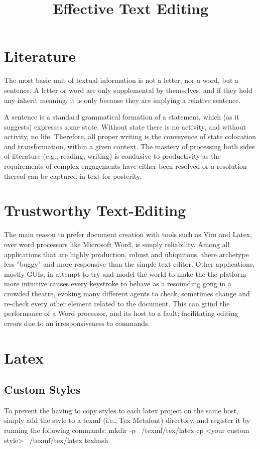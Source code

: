 \documentclass{article}
\title{Effective Text Editing}
\begin{document}
\tableofcontents
\clearpage
\section{Literature}
The most basic unit of textual information is not a letter, nor a word, but a sentence.  A letter or word are only supplemental by themselves, and if they hold any inherit meaning, it is only because they are implying a relative sentence.

A sentence is a standard grammatical formation of a statement, which (as it suggests) expresses some state.  Without state there is no activity, and without activity, no life.  Therefore, all proper writing is the conveyence of state colocation and transformation, within a given context.  The mastery of processing both sides of literature (e.g., reading, writing) is condusive to productivity as the requirements of complex engagements have either been resolved or a resolution thereof can be captured in text for posterity.

\section{Trustworthy Text-Editing}
The main reason to prefer document creation with tools such as Vim and Latex, over word processors like Microsoft Word, is simply reliability.  Among all applications that are highly production, robust and ubiquitous, there archetype less "buggy" and more responsive than the simple text editor.  Other applications, mostly GUIs, in attempt to try and model the world to make the the platform more intuitive causes every keystroke to behave as a resounding gong in a crowded theatre, evoking many different agents to check, sometimes change and re-check every other element related to the document.  This can grind the performance of a Word processor, and its host to a fault; facilitating editing errors due to an irresponsiveness to commands. 

\section{Latex}
\subsection{Custom Styles}
To prevent the having to copy styles to each latex project on the same host, simply add the style to a texmf (i.e., Tex Metafont) directory, and register it by running the following commands:
mkdir -p ~/texmf/tex/latex
cp <your custom style> ~/texmf/tex/latex
texhash
\end{document}
